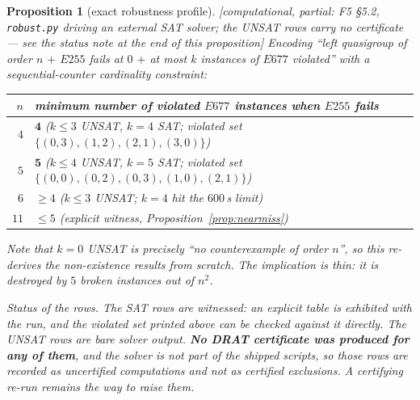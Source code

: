 \documentclass[11pt]{article}
\theoremstyle{plain}
\newtheorem{proposition}[theorem]{Proposition}
\theoremstyle{definition}
\theoremstyle{remark}
\numberwithin{equation}{section}
\newcommand{\statusbox}[1]{{\small\sloppy\textsf{[#1]}}}
\newcommand{\PARTIAL}[1]{\statusbox{computational, partial: #1}}
\begin{document}
\begin{proposition}[exact robustness profile]\label{prop:robust}
\PARTIAL{F5 \S5.2, \texttt{robust.py} driving an external SAT solver; the UNSAT rows carry no
certificate --- see the status note at the end of this proposition}
Encoding ``left quasigroup of order $n$ $+$ $E255$ fails at $0$ $+$ at most $k$ instances of
$E677$ violated'' with a sequential-counter cardinality constraint:
\begin{center}
{\small
\begin{tabular}{rl}
\toprule
$n$ & minimum number of violated $E677$ instances when $E255$ fails\\
\midrule
$4$ & $\mathbf{4}$ \quad ($k\le3$ UNSAT, $k=4$ SAT; violated set $\{(0,3),(1,2),(2,1),(3,0)\}$)\\
$5$ & $\mathbf{5}$ \quad ($k\le4$ UNSAT, $k=5$ SAT; violated set $\{(0,0),(0,2),(0,3),(1,0),(2,1)\}$)\\
$6$ & $\ge 4$ \quad ($k\le3$ UNSAT; $k=4$ hit the $600$\,s limit)\\
$11$ & $\le 5$ \quad (explicit witness, Proposition~\ref{prop:nearmiss})\\
\bottomrule
\end{tabular}}
\end{center}
Note that $k=0$ UNSAT is precisely ``no counterexample of order $n$'', so this re-derives the
non-existence results from scratch. The implication is \emph{thin}: it is destroyed by $5$
broken instances out of $n^2$.

\emph{Status of the rows.} The SAT rows are witnessed: an explicit table is exhibited with the
run, and the violated set printed above can be checked against it directly. The UNSAT rows are
bare solver output. \textbf{No DRAT certificate was produced for any of them}, and the solver
is not part of the shipped scripts, so those rows are recorded as uncertified computations and
not as certified exclusions. A certifying re-run remains the way to raise them.
\end{proposition}
\end{document}
